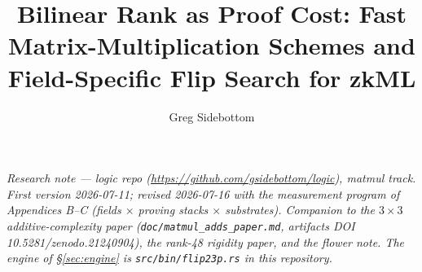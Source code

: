 \documentclass[10pt]{article}
\title{\bfseries Bilinear Rank as Proof Cost: Fast
  Matrix-Multiplication Schemes and Field-Specific Flip Search for
  zkML}
\author{Greg Sidebottom}
\date{}
\begin{document}
\maketitle
\vspace{-3em}
\begin{center}
\itshape Research note --- logic repo
(\url{https://github.com/gsidebottom/logic}), matmul track. First
version 2026-07-11; revised 2026-07-16 with the measurement program
of Appendices B--C (fields $\times$ proving stacks $\times$
substrates). Companion to the $3\times3$ additive-complexity paper
(\texttt{doc/matmul\_adds\_paper.md}, artifacts DOI
10.5281/zenodo.21240904), the rank-48 rigidity paper, and the flower
note. The engine of \S\ref{sec:engine} is
\texttt{src/bin/flip23p.rs} in this repository.
\end{center}
\end{document}
